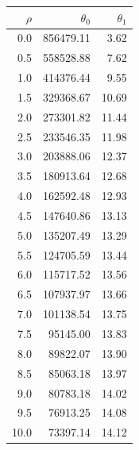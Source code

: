 \documentclass[11pt,letterpaper]{article}
\begin{document}
\begin{itemize}
\begin{itemize}
\begin{center}
\begin{tabular}{|r|r|r|}
\hline
\textbf{$\rho$} & \textbf{$\theta_{0}$} & \textbf{$\theta_{1}$} \\ \hline
0.0             & 856479.11             & 3.62                                       \\ \hline
0.5             & 558528.88             & 7.62                                       \\ \hline
1.0             & 414376.44             & 9.55                                       \\ \hline
1.5             & 329368.67             & 10.69                                      \\ \hline
2.0             & 273301.82             & 11.44                                      \\ \hline
2.5             & 233546.35             & 11.98                                      \\ \hline
3.0             & 203888.06             & 12.37                                      \\ \hline
3.5             & 180913.64             & 12.68                                      \\ \hline
4.0             & 162592.48             & 12.93                                      \\ \hline
4.5             & 147640.86             & 13.13                                      \\ \hline
5.0             & 135207.49             & 13.29                                      \\ \hline
5.5             & 124705.59             & 13.44                                      \\ \hline
6.0             & 115717.52             & 13.56                                      \\ \hline
6.5             & 107937.97             & 13.66                                      \\ \hline
7.0             & 101138.54             & 13.75                                      \\ \hline
7.5             & 95145.00              & 13.83                                      \\ \hline
8.0             & 89822.07              & 13.90                                      \\ \hline
8.5             & 85063.18              & 13.97                                      \\ \hline
9.0             & 80783.18              & 14.02                                      \\ \hline
9.5             & 76913.25              & 14.08                                      \\ \hline
10.0            & 73397.14              & 14.12                                      \\ \hline
\end{tabular}
\end{center}


\end{itemize}
\end{itemize}
\end{document}
